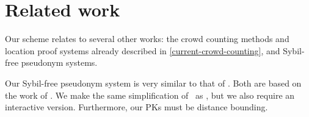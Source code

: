 \section{Related work}%
\label{related-work}

Our scheme relates to several other works: the crowd counting methods and 
location proof systems already described in \cref{current-crowd-counting}, and 
Sybil-free pseudonym systems.

Our Sybil-free pseudonym system is very similar to that of 
\textcite{SybilFreePseudonyms}.
Both are based on the work of \textcite{HowToWinTheCloneWars}.
We make the same simplification of~\cite{HowToWinTheCloneWars} as 
\textcite{SybilFreePseudonyms}, but we also require an interactive version.
Furthermore, our \acp{PK} must be distance bounding.

